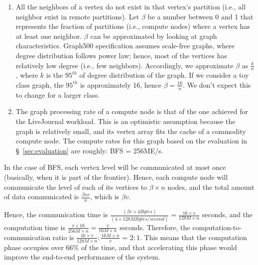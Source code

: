 \begin{enumerate}
\item All the neighbors of a vertex do not exist in that vertex's partition (i.e., all neighbor exist in remote partitions). Let $\beta$ be a number between 0 and 1 that represents the fraction of partitions (i.e., compute nodes) where a vertex has at least one neighbor. $\beta$ can be approximated by looking at graph characteristics. Graph500 specification assumes scale-free graphs, where degree distribution follows power law; hence, most of the vertices has relatively low degree (i.e., few neighbors). Accordingly, we approximate $\beta$ as $\frac{k}{n}$, where $k$ is the $95^{th}$ of degree distribution of the graph. If we consider a toy class graph, the $95^{th}$ is approximately 16, hence $\beta = \frac{16}{n}$. We don't expect this to change for a larger class.

\item The graph processing rate of a compute node is that of the one achieved for the LiveJournal workload. This is an optimistic assumption because the graph is relatively small, and its vertex array fits the cache of a commodity compute node. The compute rates for this graph based on the evaluation in \S~\ref{sec:evaluation} are roughly: BFS = 256ME/s.
\end{enumerate}

In the case of BFS, each vertex level will be communicated at most once (basically, when it is part of the frontier).  Hence, each compute node will communicate the level of each of its vertices to $\beta \times n$ nodes, and the total amount of data communicated is $\frac{\beta n v}{n}$, which is $\beta v$. 

Hence, the communication time is $\frac{(\beta v \times 4Bytes)}{(4 \times 128MBytes/second)} = \frac{16 \times v}{128M \times n}$ seconds, and the computation time is $\frac{v \times 16}{256M \times n} = \frac{v}{16M \times n}$ seconds. Therefore, the computation-to-communication ratio is $\frac{16 \times v}{128M \times n} : \frac{16M \times n}{v}$ = $2:1$. This means that the computation phase occupies over 66\% of the time, and that accelerating this phase would improve the end-to-end performance of the system.
